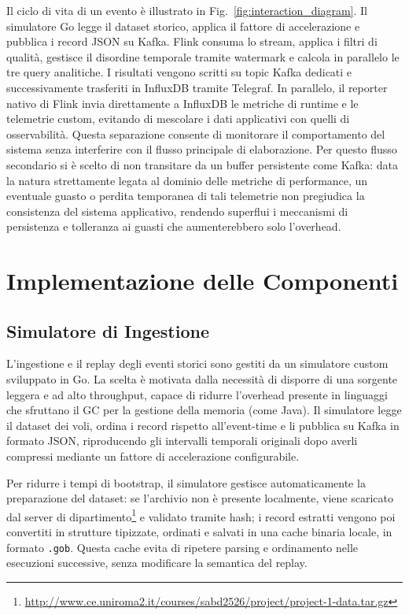 \documentclass[conference]{IEEEtran}
\begin{document}
Il ciclo di vita di un evento è illustrato in Fig.~\ref{fig:interaction_diagram}. Il simulatore Go legge il dataset storico, applica il fattore di accelerazione e pubblica i record JSON su Kafka. Flink consuma lo stream, applica i filtri di qualità, gestisce il disordine temporale tramite watermark e calcola in parallelo le tre query analitiche. I risultati vengono scritti su topic Kafka dedicati e successivamente trasferiti in InfluxDB tramite Telegraf. In parallelo, il reporter nativo di Flink invia direttamente a InfluxDB le metriche di runtime e le telemetrie custom, evitando di mescolare i dati applicativi con quelli di osservabilità. Questa separazione consente di monitorare il comportamento del sistema senza interferire con il flusso principale di elaborazione. Per questo flusso secondario si è scelto di non transitare da un buffer persistente come Kafka: data la natura strettamente legata al dominio delle metriche di performance, un eventuale guasto o perdita temporanea di tali telemetrie non pregiudica la consistenza del sistema applicativo, rendendo superflui i meccanismi di persistenza e tolleranza ai guasti che aumenterebbero solo l'overhead.


\section{Implementazione delle Componenti}\label{sec:implementation_details}

\subsection{Simulatore di Ingestione}\label{subsec:ingestion_simulator}
L'ingestione e il replay degli eventi storici sono gestiti da un simulatore custom sviluppato in Go. La scelta è motivata dalla necessità di disporre di una sorgente leggera e ad alto throughput, capace di ridurre l'overhead presente in linguaggi che sfruttano il GC per la gestione della memoria (come Java). 
Il simulatore legge il dataset dei voli, ordina i record rispetto all'event-time e li pubblica su Kafka in formato JSON, riproducendo gli intervalli temporali originali dopo averli compressi mediante un fattore di accelerazione configurabile.

Per ridurre i tempi di bootstrap, il simulatore gestisce automaticamente la preparazione del dataset: se l'archivio non è presente localmente, viene scaricato dal server di dipartimento\footnote{\url{http://www.ce.uniroma2.it/courses/sabd2526/project/project-1-data.tar.gz}} e validato tramite hash; i record estratti vengono poi convertiti in strutture tipizzate, ordinati e salvati in una cache binaria locale, in formato \texttt{.gob}. Questa cache evita di ripetere parsing e ordinamento nelle esecuzioni successive, senza modificare la semantica del replay.
\end{document}
